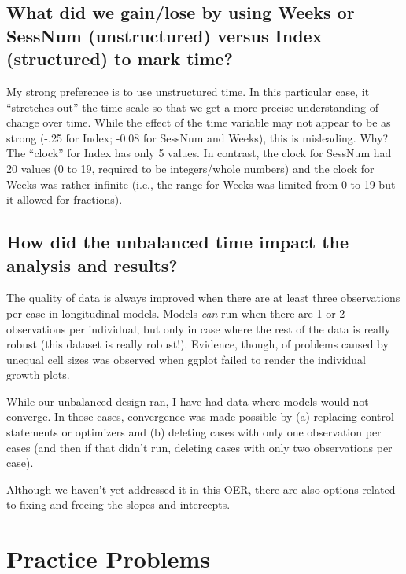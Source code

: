 \documentclass[
  english,
]{book}
\begin{document}
\hypertarget{what-did-we-gainlose-by-using-weeks-or-sessnum-unstructured-versus-index-structured-to-mark-time}{%
\subsection{What did we gain/lose by using Weeks or SessNum (unstructured) versus Index (structured) to mark time?}\label{what-did-we-gainlose-by-using-weeks-or-sessnum-unstructured-versus-index-structured-to-mark-time}}

My strong preference is to use unstructured time. In this particular case, it ``stretches out'' the time scale so that we get a more precise understanding of change over time. While the effect of the time variable may not appear to be as strong (-.25 for Index; -0.08 for SessNum and Weeks), this is misleading. Why? The ``clock'' for Index has only 5 values. In contrast, the clock for SessNum had 20 values (0 to 19, required to be integers/whole numbers) and the clock for Weeks was rather infinite (i.e., the range for Weeks was limited from 0 to 19 but it allowed for fractions).

\hypertarget{how-did-the-unbalanced-time-impact-the-analysis-and-results}{%
\subsection{How did the unbalanced time impact the analysis and results?}\label{how-did-the-unbalanced-time-impact-the-analysis-and-results}}

The quality of data is always improved when there are at least three observations per case in longitudinal models. Models \emph{can} run when there are 1 or 2 observations per individual, but only in case where the rest of the data is really robust (this dataset is really robust!). Evidence, though, of problems caused by unequal cell sizes was observed when ggplot failed to render the individual growth plots.

While our unbalanced design ran, I have had data where models would not converge. In those cases, convergence was made possible by (a) replacing control statements or optimizers and (b) deleting cases with only one observation per cases (and then if that didn't run, deleting cases with only two observations per case).

Although we haven't yet addressed it in this OER, there are also options related to fixing and freeing the slopes and intercepts.

\hypertarget{practice-problems-3}{%
\section{Practice Problems}\label{practice-problems-3}}
\end{document}
